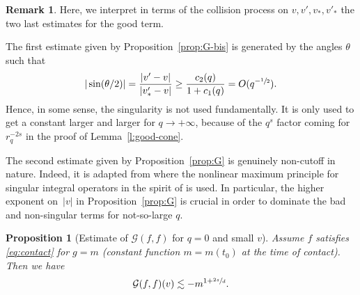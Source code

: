 \documentclass[JEP,XML,SOM,Unicode,NoFloatCountersInSection]{cedram}
\theoremstyle{plain}
\newtheorem{prop}[thm]{Proposition}
\theoremstyle{definition}
\newtheorem{remark}[thm]{Remark}
\numberwithin{equation}{section}
\begin{document}
\begin{remark} Here, we interpret in terms of the collision process on
$v,v',v_*,v'_*$ the two last estimates for the good term.

The first estimate given by Proposition~\ref{prop:G-bis} is
generated by the angles $\theta$ such that
\[
|\sin (\theta/2)| = \frac{|v'-v|}{|v'_*-v|} \ge
\frac{c_2(q)}{1+c_1(q)} = O(q^{-\sfrac12}).
\]
Hence, in some sense, the singularity is not used fundamentally. It
is only used to get a constant larger and larger for
$q \to + \infty$, because of the $q^s$ factor coming for $r_q^{-2s}$
in the proof of Lemma~\ref{l:good-cone}.

The second estimate given by Proposition~\ref{prop:G} is genuinely
non-cutoff in nature. Indeed, it is adapted from \cite{luis} where
the nonlinear maximum principle for singular integral operators in
the spirit of \cite{constantinvicol} is used. In particular, the
higher exponent on~$|v|$ in Proposition~\ref{prop:G} is crucial in
order to dominate the bad and non-singular terms for not-so-large
$q$.
\end{remark}


\begin{prop}[Estimate of {$\mathcal{G} (f,f)$} for $q=0$ and small
$v$] \label{prop:Gsmallv} Assume $f$ satisfies \eqref{eq:contact}
for $g = m$ (constant function $m=m(t_0)$ at the time of contact).
Then we have
\[
\mathcal{G} (f,f)(v) \lesssim - m^{1+\sfrac{2s}d}.
\]
\end{prop}
\end{document}
